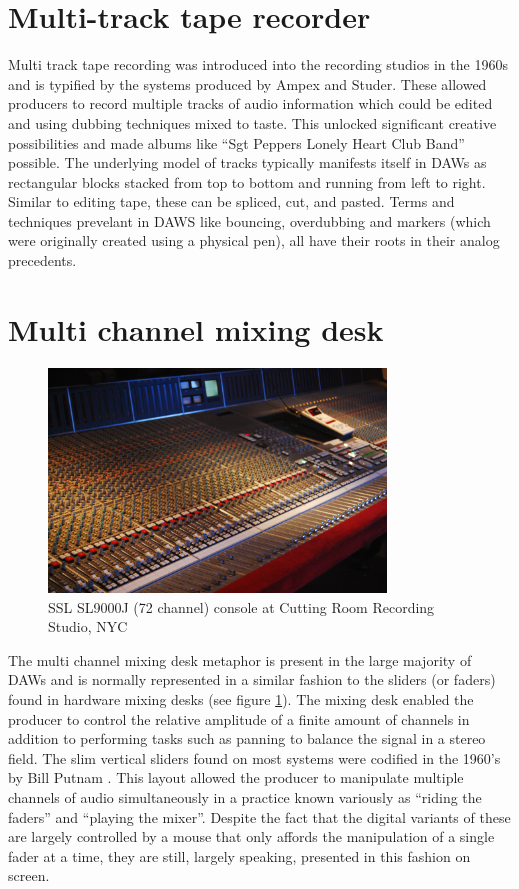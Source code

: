 \documentclass[12pt]{report}
\begin{document}
\section{Multi-track tape recorder}
\label{sec:org1ced785}
Multi track tape recording was introduced into the recording studios in the
1960s and is typified by the systems produced by Ampex and Studer. These
allowed producers to record multiple tracks of audio information which could be
edited and using dubbing techniques mixed to taste. This unlocked significant
creative possibilities and made albums like ``Sgt Peppers Lonely Heart Club Band''
possible. The underlying model of tracks typically manifests itself in DAWs as
rectangular blocks stacked from top to bottom and running from left to right.
Similar to editing tape, these can be spliced, cut, and pasted. Terms and
techniques prevelant in DAWS like bouncing, overdubbing and markers (which were
originally created using a physical pen), all have their roots in their analog
precedents.

\section{Multi channel mixing desk}
\label{sec:org56e155b}
\begin{LATEX}
\begin{figure}[h]
\centering
\includegraphics[width=0.8\textwidth]{./assets/ssl-hardware-mixer.jpg}
\caption{SSL SL9000J (72 channel) console at Cutting Room Recording Studio, NYC}
\label{fig:hardware-mixer}
\end{figure}
\label{org68040aa}
\end{LATEX}
The multi channel mixing desk metaphor is present in the large majority of DAWs
and is normally represented in a similar fashion to the sliders (or faders)
found in hardware mixing desks (see figure \ref{fig:hardware-mixer}). The mixing
desk enabled the producer to control the relative amplitude of a finite amount
of channels in addition to performing tasks such as panning to balance the
signal in a stereo field. The slim vertical sliders found on most systems were
codified in the 1960's by Bill Putnam \cite{bell_journal_2015}. This layout
allowed the producer to manipulate multiple channels of audio simultaneously in
a practice known variously as ``riding the faders'' and ``playing the mixer''.
Despite the fact that the digital variants of these are largely controlled by a
mouse that only affords the manipulation of a single fader at a time, they are
still, largely speaking, presented in this fashion on screen.
\end{document}
